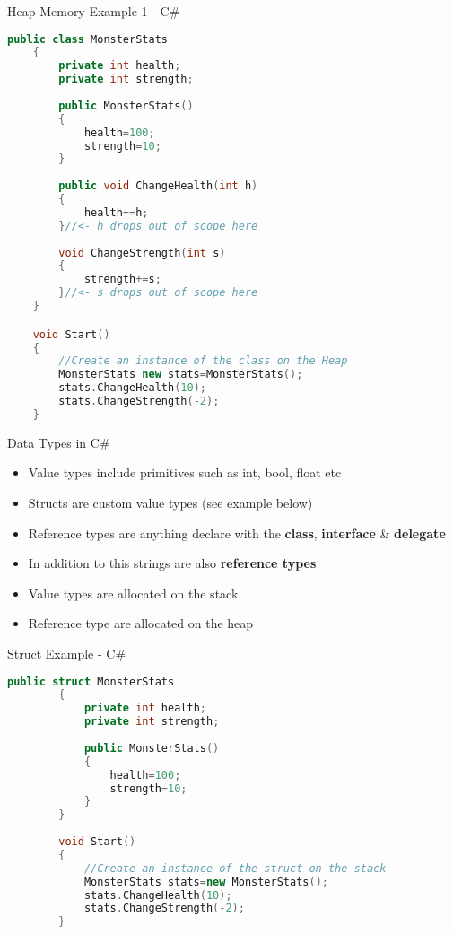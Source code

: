 \begin{frame}[fragile]{Heap Memory Example 1 - C\#}
\begin{lstlisting}[language=C++,basicstyle=\tiny,]
	public class MonsterStats
	{
		private int health;
		private int strength;
		
		public MonsterStats()
		{
			health=100;
			strength=10;
		}
	
		public void ChangeHealth(int h)
		{
			health+=h;
		}//<- h drops out of scope here
	
		void ChangeStrength(int s)
		{
			strength+=s;
		}//<- s drops out of scope here
	}

	void Start()
	{		
		//Create an instance of the class on the Heap
		MonsterStats new stats=MonsterStats();
		stats.ChangeHealth(10);
		stats.ChangeStrength(-2);
	}	
\end{lstlisting}
\end{frame}

\begin{frame}{Data Types in C\#}
	\begin{itemize}
		\item Value types include primitives such as int, bool, float etc
		\item Structs are custom value types (see example below)
		\item Reference types are anything declare with the \textbf{class}, \textbf{interface} \& \textbf{delegate}
		\item In addition to this strings are also \textbf{reference types}
		\item Value types are allocated on the stack
		\item Reference type are allocated on the heap
	\end{itemize}
\end{frame}

\begin{frame}[fragile]{Struct Example - C\#}
	\begin{lstlisting}[language=C++,basicstyle=\tiny,]
		public struct MonsterStats
		{
			private int health;
			private int strength;
			
			public MonsterStats()
			{
				health=100;
				strength=10;
			}
		}
	
		void Start()
		{		
			//Create an instance of the struct on the stack
			MonsterStats stats=new MonsterStats();
			stats.ChangeHealth(10);
			stats.ChangeStrength(-2);
		}	
	\end{lstlisting}
\end{frame}

